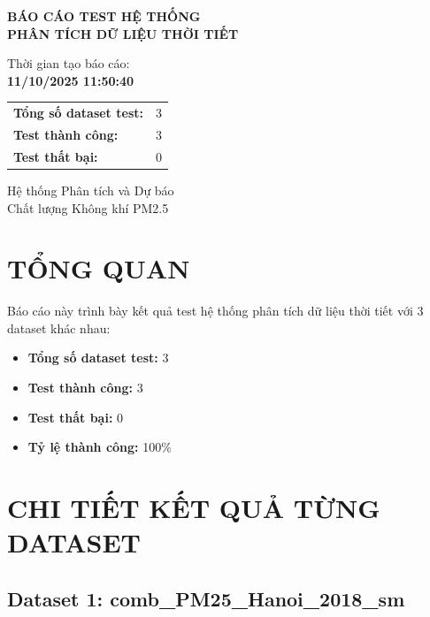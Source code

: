 \documentclass[12pt,a4paper]{article}
\begin{document}
\begin{titlepage}
    \centering
    \vspace*{2cm}
    
    {\Huge\bfseries BÁO CÁO TEST HỆ THỐNG\\[0.5cm]
    PHÂN TÍCH DỮ LIỆU THỜI TIẾT\\[2cm]}
    
    {\Large Thời gian tạo báo cáo:\\[0.3cm]
    \textbf{11/10/2025 11:50:40}\\[3cm]}
    
    {\large
    \begin{tabular}{ll}
        \textbf{Tổng số dataset test:} & 3\\
        \textbf{Test thành công:} & \textcolor{successcolor}{3}\\
        \textbf{Test thất bại:} & 0\\
    \end{tabular}
    }
    
    \vfill
    {\large Hệ thống Phân tích và Dự báo\\[0.2cm]
    Chất lượng Không khí PM2.5}
\end{titlepage}

\tableofcontents
\newpage

\section{TỔNG QUAN}

Báo cáo này trình bày kết quả test hệ thống phân tích dữ liệu thời tiết với 3 dataset khác nhau:

\begin{itemize}[leftmargin=*]
    \item \textbf{Tổng số dataset test:} 3
    \item \textbf{Test thành công:} \textcolor{successcolor}{3}
    \item \textbf{Test thất bại:} 0
    \item \textbf{Tỷ lệ thành công:} 100\%
\end{itemize}

\section{CHI TIẾT KẾT QUẢ TỪNG DATASET}

\subsection{Dataset 1: comb\_PM25\_Hanoi\_2018\_sm}
\end{document}
